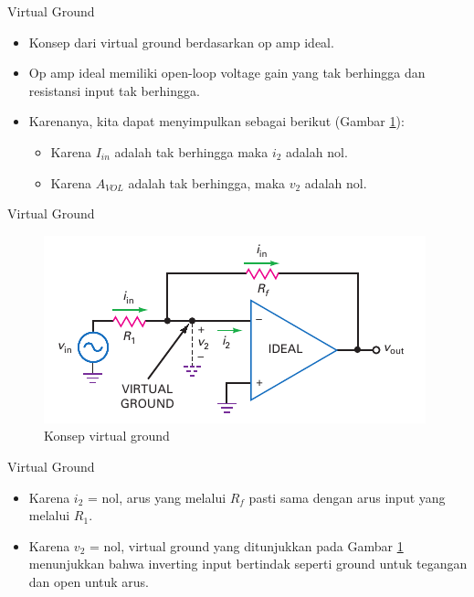 \begin{frame}{Virtual Ground}
	\begin{itemize}
		\item Konsep dari virtual ground berdasarkan op amp ideal.
		\item Op amp ideal memiliki open-loop voltage gain yang tak berhingga dan resistansi input tak berhingga.
		\item Karenanya, kita dapat menyimpulkan sebagai berikut (Gambar \ref{fig-16.13}):
		\begin{itemize}
			\item Karena $ I_{in} $ adalah tak berhingga maka $ i_2 $ adalah nol.
			\item Karena $ A_{VOL} $ adalah tak berhingga, maka $ v_2 $ adalah nol.
		\end{itemize}
	\end{itemize}
\end{frame}

\begin{frame}{Virtual Ground}
	\begin{figure}
		\centering
		\includegraphics[height=0.7\textheight]{gambar/fig-16.13}
		\caption{Konsep virtual ground}
		\label{fig-16.13}
	\end{figure}
\end{frame}

\begin{frame}{Virtual Ground}
	\begin{itemize}
		\item Karena $ i_2 $ = nol, arus yang melalui $ R_f $ pasti sama dengan arus input yang melalui $ R_1 $.
		\item Karena $ v_2 $ = nol, virtual ground yang ditunjukkan pada Gambar \ref{fig-16.13} menunjukkan bahwa inverting input bertindak seperti ground untuk tegangan dan open untuk arus.
	\end{itemize}
\end{frame}

